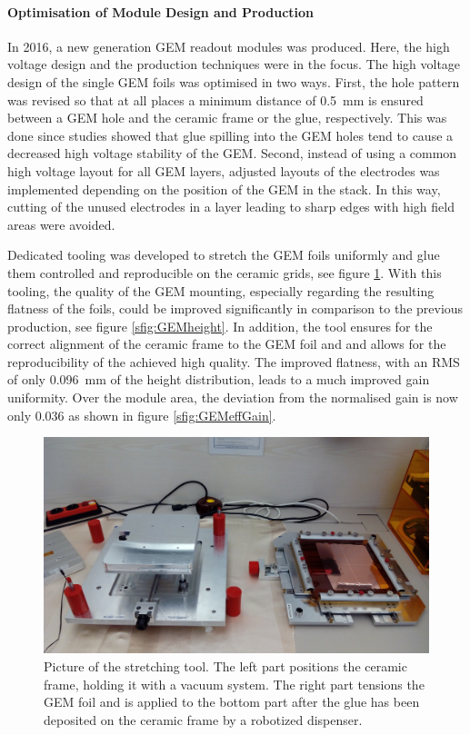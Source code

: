 \paragraph{Optimisation of Module Design and Production}

In 2016, a new generation GEM readout modules was produced. Here, the high voltage design and the production techniques were in the focus. 
The high voltage design of the single GEM foils was optimised in two ways. 
First, the hole pattern was revised so that at all places a minimum distance of \SI{0.5}{\mm} is ensured between a GEM hole and the ceramic frame or the glue, respectively.  
This was done since studies showed that glue spilling into the GEM holes tend to cause a decreased high voltage stability of the GEM. 
Second, instead of using a common high voltage layout for all GEM layers, adjusted layouts of the electrodes was implemented depending on the position of the GEM in the stack. 
In this way, cutting of the unused electrodes in a layer leading to sharp edges with high field areas were avoided.

Dedicated tooling was developed to stretch the GEM foils uniformly and glue them controlled and reproducible on the ceramic grids, see figure \ref{fig:gemstretch}. 
With this tooling, the quality of the GEM mounting, especially regarding the resulting flatness of the foils, could be improved significantly in comparison to the previous production, see figure \ref{sfig:GEMheight}.
In addition, the tool ensures for the correct alignment of the ceramic frame to the GEM foil and and allows for the reproducibility of the achieved high quality.
The improved flatness, with an RMS of only \SI{0.096}{\mm} of the height distribution, leads to a much improved gain uniformity. 
Over the module area, the deviation from the normalised gain is now only 0.036 as shown in figure \ref{sfig:GEMeffGain}.

\begin{figure}
    \centering
    \includegraphics[height=0.4\textwidth]{Tracker/TPC_Bonn/plots/TPC-DG_stretching_tool.jpg}
    \caption{Picture of the stretching tool. The left part positions the ceramic frame, holding it with a vacuum system. The right part tensions the GEM foil and is applied to the bottom part after the glue has been deposited on the ceramic frame by a robotized dispenser.}
    \label{fig:gemstretch}
\end{figure}

